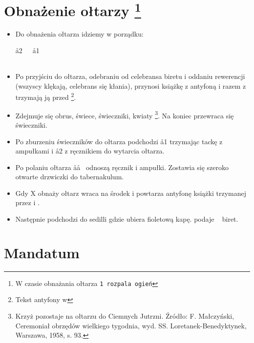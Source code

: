 \section{Obnażenie ołtarzy \protect\footnote{W czasie obnażania ołtarza \tt1
        rozpala ogień}}

\begin{itemize}
      \item Do obnażenia ołtarza idziemy w porządku:
            \begin{center}
                  \aa2~~~\aa1\smallskip\\
                  ~~~\smallskip\\
                  \ii
            \end{center}
      \item Po przyjściu do ołtarza, odebraniu od celebransa biretu i oddaniu
            rewerencji (wszyscy klękają, celebrans się kłania),  przynosi
            książkę z antyfoną i razem z  trzymają ją przed \ii
            \footnote{Tekst antyfony w }.
      \item Zdejmuje się obrus, świece, świeczniki, kwiaty \footnote{Krzyż
                  pozostaje na ołtarzu do Ciemnych Jutrzni. Źródło: F. Małczyński,
                  Ceremoniał obrzędów wielkiego tygodnia, wyd. SS.
                  Loretanek-Benedyktynek, Warszawa, 1958, s. 93.}. Na koniec przewraca
            się świeczniki.
      \item Po zburzeniu świeczników do ołtarza podchodzi \aa1 trzymając tackę z
            ampułkami i \aa2 z ręcznikiem do wytarcia ołtarza.
      \item Po polaniu ołtarza \aa\aa~ odnoszą ręcznik i ampułki. Zostawia się
            szeroko otwarte drzwiczki do tabernakulum.
      \item Gdy X obnaży ołtarz wraca na środek i powtarza antyfonę książki
            trzymanej przez  i .
      \item Następnie podchodzi do sedilli gdzie ubiera fioletową kapę. 
            podaje \ii~ biret.
\end{itemize}

\section{Mandatum}

